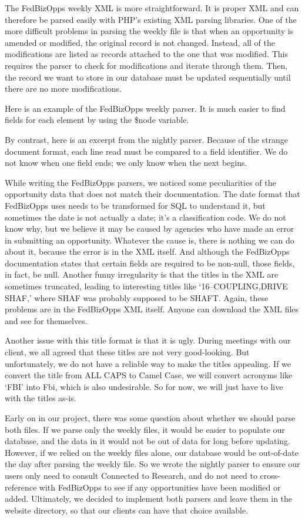 \documentclass[onecolumn]{IEEEtran}
\begin{document}
The FedBizOpps weekly XML is more straightforward. It is proper XML and can therefore be parsed easily with PHP's existing XML parsing libraries. One of the more difficult problems in parsing the weekly file is that when an opportunity is amended or modified, the original record is not changed. Instead, all of the modifications are listed as records attached to the one that was modified. This requires the parser to check for modifications and iterate through them. Then, the record we want to store in our database must be updated sequentially until there are no more modifications.

Here is an example of the FedBizOpps weekly parser. It is much easier to find fields for each element by using the \$node variable.


By contrast, here is an excerpt from the nightly parser. Because of the strange document format, each line read must be compared to a field identifier. We do not know when one field ends; we only know when the next begins.


While writing the FedBizOpps parsers, we noticed some peculiarities of the opportunity data that does not match their documentation. The date format that FedBizOpps uses needs to be transformed for SQL to understand it, but sometimes the date is not actually a date; it's a classification code. We do not know why, but we believe it may be caused by agencies who have made an error in submitting an opportunity. Whatever the cause is, there is nothing we can do about it, because the error is in the XML itself. And although the FedBizOpps documentation states that certain fields are required to be non-null, those fields, in fact, be null. Another funny irregularity is that the titles in the XML are sometimes truncated, leading to interesting titles like `16--COUPLING,DRIVE SHAF,' where SHAF was probably supposed to be SHAFT. Again, these problems are in the FedBizOpps XML itself. Anyone can download the XML files and see for themselves. 

Another issue with this title format is that it is ugly. During meetings with our client, we all agreed that these titles are not very good-looking. But unfortunately, we do not have a reliable way to make the titles appealing. If we convert the title from ALL CAPS to Camel Case, we will convert acronyms like `FBI' into Fbi, which is also undesirable. So for now, we will just have to live with the titles as-is.

Early on in our project, there was some question about whether we should parse both files. If we parse only the weekly files, it would be easier to populate our database, and the data in it would not be out of data for long before updating. However, if we relied on the weekly files alone, our database would be out-of-date the day after parsing the weekly file. So we wrote the nightly parser to ensure our users only need to consult Connected to Research, and do not need to cross-reference with FedBizOpps to see if any opportunities have been modified or added. Ultimately, we decided to implement both parsers and leave them in the website directory, so that our clients can have that choice available.
\end{document}
